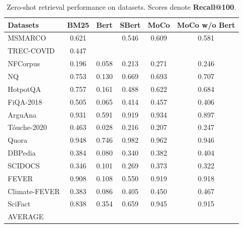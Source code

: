 \begin{table}[t!]
    \centering
    \begin{tabular}{l | c c c c c }
        \toprule
        Datasets & BM25 & Bert & SBert & MoCo & MoCo w/o Bert \\
        \midrule
   MSMARCO       & 0.621 & & 0.546 & 0.609 & 0.581 \\ \midrule
   TREC-COVID    & 0.447 & & & \\
   NFCorpus      & 0.196 & 0.058 & 0.213 & 0.271 & 0.246 \\ \midrule
   NQ            & 0.753 & 0.130 & 0.669 & 0.693 & 0.707 \\ 
   HotpotQA      & 0.757 & 0.161 & 0.488 & 0.622 & 0.684 \\ 
   FiQA-2018     & 0.505 & 0.065 & 0.414 & 0.457 & 0.406 \\ \midrule
   ArguAna       & 0.931 & 0.591 & 0.919 & 0.934 & 0.897 \\  
   T\'ouche-2020 & 0.463 & 0.028 & 0.216 & 0.207 & 0.247 \\ \midrule 
   Quora         & 0.948 & 0.746 & 0.982 & 0.962 & 0.946 \\ \midrule
   DBPedia       & 0.384 & 0.080 & 0.340 & 0.382 & 0.404 \\ \midrule
   SCIDOCS       & 0.346 & 0.101 & 0.269 & 0.373 & 0.322 \\ \midrule
   FEVER         & 0.908 & 0.108 & 0.550 & 0.919 & 0.918 \\ 
   Climate-FEVER & 0.383 & 0.086 & 0.405 & 0.450 & 0.467 \\ 
   SciFact       & 0.838 & 0.354 & 0.659 & 0.945 & 0.915 \\ \midrule
   AVERAGE       \\ 
        \bottomrule
    \end{tabular}
    \caption{Zero-shot retrieval performance on \beir datasets. Scores denote \textbf{Recall@100}.}
    \label{tab:results-recall}
\end{table}